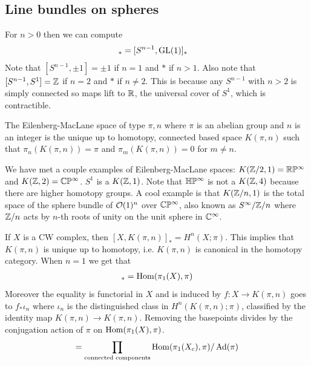 \documentclass[12pt]{article}
\begin{document}
\subsection{Line bundles on spheres}
For $n>0$ then we can compute \begin{align*}
    [\Bun_{\GL(1)}(S^n)]_* &= [S^{n-1}, \GL(1)]_* 
\end{align*}
Note that $[S^{n-1}, \pm 1] = \pm 1$ if $n=1$ and $*$ if $n>1$. Also note that $[S^{n-1}, S^1] = \mathbb{Z}$ if $n=2$ and $*$ if $n\neq 2$. This is because any $S^{n-1}$ with $n>2$ is simply connected so maps lift to $\mathbb{R}$, the universal cover of $S^1$, which is contractible.

\begin{remark}
    The Eilenberg-MacLane space of type $\pi,n$ where $\pi$ is an abelian group and $n$ is an integer is the unique up to homotopy, connected based space $K(\pi,n)$ such that $\pi_n(K(\pi,n)) = \pi$ and $\pi_m(K(\pi,n)) = 0$ for $m\neq n$. 
\end{remark}

We have met a couple examples of Eilenberg-MacLane spaces: $K(\mathbb{Z}/2,1) = \mathbb{R}\mathbb{P}^\infty$ and $K(\mathbb{Z},2) = \mathbb{C}\mathbb{P}^\infty$. $S^1$ is a $K(\mathbb{Z},1)$. Note that $\mathbb{H}\mathbb{P}^\infty$ is not a $K(\mathbb{Z},4)$ because there are higher homotopy groups. A cool example is that $K(\mathbb{Z}/n,1)$ is the total space of the sphere bundle of ${\mathcal{O}}(1)^n$ over $\mathbb{C}\mathbb{P}^\infty$, also known as $S^\infty/\mathbb{Z}/n$ where $\mathbb{Z}/n$ acts by $n$-th roots of unity on the unit sphere in $\mathbb{C}^\infty$.

\begin{theorem}
    If $X$ is a CW complex, then $[X, K(\pi,n)]_* = H^n(X; \pi)$. This implies that $K(\pi,n)$ is unique up to homotopy, i.e. $K(\pi,n)$ is canonical in the homotopy category. When $n=1$ we get that \begin{align*}
        [X, K(\pi,n)]_* = \Hom(\pi_1(X), \pi)
    \end{align*}
    Moreover the equality is functorial in $X$ and is induced by $f:X \to K(\pi,n)$ goes to $f_*\iota_n$ where $\iota_n$ is the distinguished class in $H^n(K(\pi,n); \pi)$, classified by the identity map $K(\pi,n) \to K(\pi,n)$.
    Removing the basepoints divides by the conjugation action of $\pi$ on $\operatorname{Hom}(\pi_1(X), \pi)$.\begin{align*}
        [X, K(\pi,n)] = \prod_{\text{connected components}} \Hom(\pi_1(X_c), \pi)/\Ad(\pi  )
    \end{align*}
\end{theorem}
\end{document}
